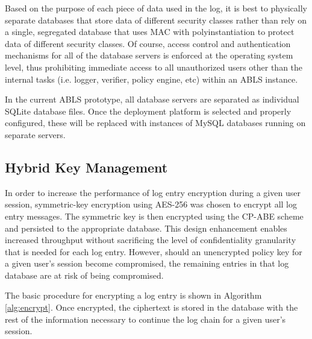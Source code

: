 \documentclass{sig-alternate}
\begin{document}
Based on the purpose of each piece of data used in the log, it is best to physically separate databases
that store data of different security classes rather than rely on a single, segregated database that uses MAC with 
polyinstantiation to protect data of different security classes. Of course, access control
and authentication mechanisms for all of the database servers is enforced at the operating system level, thus
prohibiting immediate access to all unauthorized users other than the internal tasks (i.e. logger, verifier, policy engine, etc) 
within an ABLS instance. 

In the current ABLS prototype, all database servers are separated as individual SQLite database files. Once
the deployment platform is selected and properly configured, these will be replaced with instances of MySQL 
databases running on separate servers.

\subsection{Hybrid Key Management}
\label{sec:keyMgmt}


In order to increase the performance of log entry encryption during a given user session, symmetric-key encryption
using AES-256 was chosen to encrypt all log entry messages. The symmetric key is then encrypted using the CP-ABE
scheme and persisted to the appropriate database. This design enhancement enables increased throughput
without sacrificing the level of confidentiality granularity that is needed for each log entry. However, should an 
unencrypted policy key for a given user's session become compromised, the remaining entries in that log database
are at risk of being compromised. 

The basic procedure for encrypting a log entry is shown in Algorithm \ref{alg:encrypt}. Once encrypted, the ciphertext
is stored in the database with the rest of the information necessary to continue the log chain for a given user's session.
  
\end{document}
